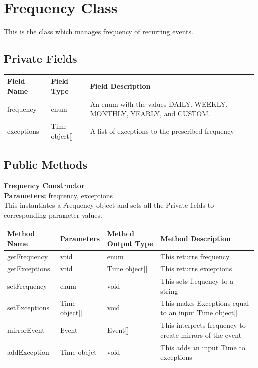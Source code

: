 \documentclass{scrreprt}
\begin{document}
\section{Frequency Class}

This is the class which manages frequency of recurring events.

\subsection{Private Fields}

\begin{center}
\begin{longtable}{ | p{3cm} | p{6cm} | p{6cm} | }
\hline
\textbf{Field Name} & \textbf{Field Type} & \textbf{Field Description} \\
\hline
frequency & enum & An enum with the values DAILY, WEEKLY, MONTHLY, YEARLY, and CUSTOM. \\
\hline
exceptions & Time object[] & A list of exceptions to the prescribed frequency \\
\hline
\end{longtable}
\end{center}

\subsection{Public Methods}

\textbf{Frequency Constructor} \\
\textbf{Parameters:} frequency, exceptions \\
This instantiates a Frequency object and sets all the Private fields to corresponding parameter values.

\begin{center}
\begin{longtable}{ | p{3cm} | p{3cm} | p{3cm} | p{5cm} | }
\hline
\textbf{Method Name} & \textbf{Parameters} & \textbf{Method Output Type} & \textbf{Method Description} \\
\hline
getFrequency & void & enum & This returns frequency \\
\hline
getExceptions & void & Time object[] & This returns exceptions \\
\hline
setFrequency & enum & void & This sets frequency to a string \\
\hline
setExceptions & Time object[] & void & This makes Exceptions equal to an input Time object[] \\
\hline
mirrorEvent & Event & Event[] & This interprets frequency to create mirrors of the event \\
\hline
addException & Time obejct & void & This adds an input Time to exceptions \\
\hline
\end{longtable}
\end{center}
\end{document}
